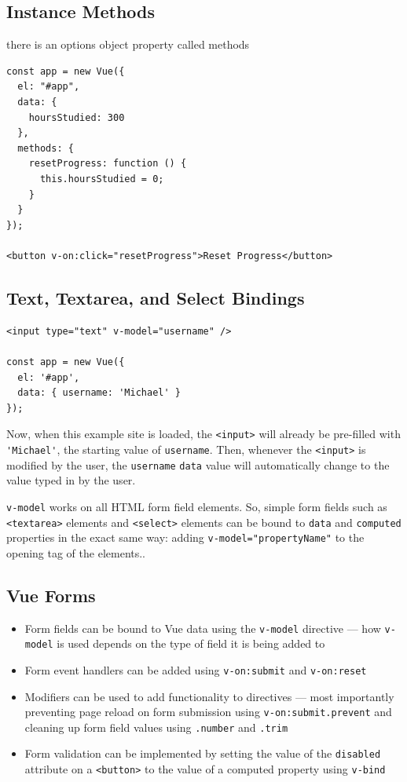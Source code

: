 \documentclass[a4paper, 12pt]{article}
\begin{document}
\subsection{Instance Methods}
there is an options object property called methods
\begin{verbatim}
const app = new Vue({
  el: "#app",
  data: {
    hoursStudied: 300
  },
  methods: {
    resetProgress: function () {
      this.hoursStudied = 0;
    }
  }
});

<button v-on:click="resetProgress">Reset Progress</button>
\end{verbatim}

\subsection{Text, Textarea, and Select Bindings}
\begin{verbatim}
<input type="text" v-model="username" />

const app = new Vue({ 
  el: '#app',
  data: { username: 'Michael' } 
});
\end{verbatim}
Now, when this example site is loaded, the \verb|<input>| will already be pre-filled with \verb|'Michael'|, the starting value of \verb|username|. Then, whenever the \verb|<input>| is modified by the user, the \verb|username| \verb|data| value will automatically change to the value typed in by the user.

\verb|v-model| works on all HTML form field elements. So, simple form fields such as \verb|<textarea>| elements and \verb|<select>| elements can be bound to \verb|data| and \verb|computed| properties in the exact same way: adding \verb|v-model="propertyName"| to the opening tag of the elements..

\subsection{Vue Forms}
\begin{itemize}
\item Form fields can be bound to Vue data using the \verb|v-model| directive — how \verb|v-model| is used depends on the type of field it is being added to

\item Form event handlers can be added using \verb|v-on:submit| and \verb|v-on:reset|

\item Modifiers can be used to add functionality to directives — most importantly preventing page reload on form submission using \verb|v-on:submit.prevent| and cleaning up form field values using \verb|.number| and \verb|.trim|

\item Form validation can be implemented by setting the value of the \verb|disabled| attribute on a \verb|<button>| to the value of a computed property using \verb|v-bind|
\end{itemize}
\end{document}
